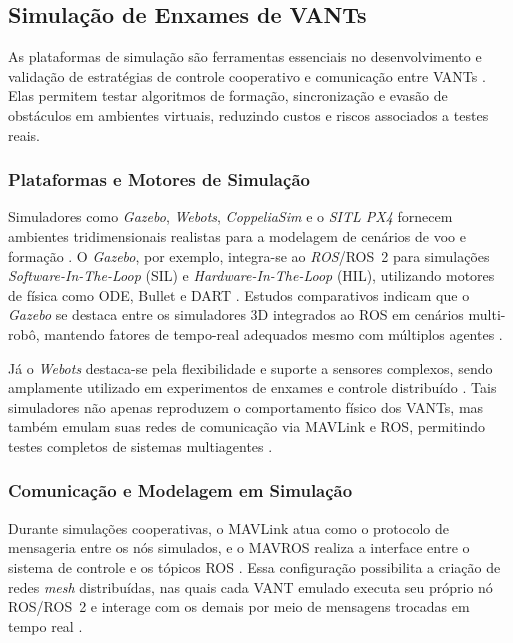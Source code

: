 \subsection{Simulação de Enxames de VANTs}

As plataformas de simulação são ferramentas essenciais no desenvolvimento e validação de estratégias de controle cooperativo e comunicação entre VANTs \citep{khaliq2021, ziming2023}. Elas permitem testar algoritmos de formação, sincronização e evasão de obstáculos em ambientes virtuais, reduzindo custos e riscos associados a testes reais.

\subsubsection{Plataformas e Motores de Simulação}

Simuladores como \textit{Gazebo}, \textit{Webots}, \textit{CoppeliaSim} e o \textit{SITL PX4} fornecem ambientes tridimensionais realistas para a modelagem de cenários de voo e formação \citep{ziming2023}. O \textit{Gazebo}, por exemplo, integra-se ao \textit{ROS}/ROS~2 para simulações \textit{Software-In-The-Loop} (SIL) e \textit{Hardware-In-The-Loop} (HIL), utilizando motores de física como ODE, Bullet e DART \citep{khaliq2021, GazeboClassic2024, GazeboPhysicsEngines2024}. Estudos comparativos indicam que o \textit{Gazebo} se destaca entre os simuladores 3D integrados ao ROS em cenários multi-robô, mantendo fatores de tempo-real adequados mesmo com múltiplos agentes \citep{Noori2017}.

Já o \textit{Webots} destaca-se pela flexibilidade e suporte a sensores complexos, sendo amplamente utilizado em experimentos de enxames e controle distribuído \citep{ziming2023}. Tais simuladores não apenas reproduzem o comportamento físico dos VANTs, mas também emulam suas redes de comunicação via MAVLink e ROS, permitindo testes completos de sistemas multiagentes \citep{Ponniah2019, Meighan2025}.

\subsubsection{Comunicação e Modelagem em Simulação}

Durante simulações cooperativas, o MAVLink atua como o protocolo de mensageria entre os nós simulados, e o MAVROS realiza a interface entre o sistema de controle e os tópicos ROS \citep{khaliq2021, Koubaa2019, MAVROS2024}. Essa configuração possibilita a criação de redes \textit{mesh} distribuídas, nas quais cada VANT emulado executa seu próprio nó ROS/ROS~2 e interage com os demais por meio de mensagens trocadas em tempo real \citep{ROS2Design2022, ROS2QoS2024}.

